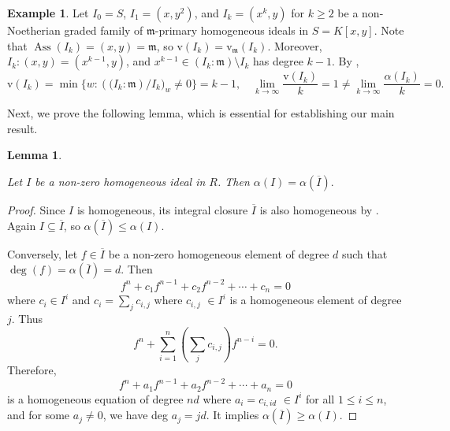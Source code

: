 \documentclass[11pt,reqno,a4paper]{amsart}
\newtheorem{corollary}[theorem]{Corollary}
\newtheorem{lemma}[theorem]{Lemma}
\theoremstyle{definition}
\newtheorem{example}[theorem]{Example}
\begin{document}
\begin{example}
    
    Let \(I_0 = S\), \(I_1 = (x,y^2)\), and \(I_k = (x^k, y)\) for \(k \ge 2\) be a non-Noetherian graded family of \(\mathfrak{m}\)-primary homogeneous ideals in \(S = K[x,y]\). 
    Note that \(\operatorname{Ass}(I_k) = (x,y) = \mathfrak{m}\), so \(\mathrm{v}(I_k) = \mathrm{v}_{\mathfrak{m}}(I_k)\). 
    Moreover, \(I_k : (x,y) = (x^{k-1}, y)\), and \(x^{k-1} \in (I_k : \mathfrak{m}) \setminus I_k\) has degree \(k-1\).
    By \cite[Lemma 1.2]{Conca24}, 
    \[
    \mathrm{v}(I_k) = \min \{ w : \left((I_k : \mathfrak{m}\right) / I_k)_w \neq 0 \} = k-1,
    \quad
    \lim_{k \to \infty} \frac{\mathrm{v}(I_k)}{k} = 1 \neq \lim_{k \to \infty} \frac{\alpha(I_k)}{k} = 0.
    \]
\end{example}

\noindent Next, we prove the following lemma, which is essential for establishing our main result.


\begin{lemma}\label{alpha(I)=alpha(I^bar)}
    

Let $I$ be a non-zero homogeneous ideal in $R$. Then $\alpha(I) = \alpha(\overline{I}).$
\end{lemma}

\begin{proof}
    
Since \(I\) is homogeneous, its integral closure \(\overline{I}\) is also homogeneous by \cite[Corollary 5.2.2]{HunekeSwanson06}. Again $I \subseteq \overline{I}$, so $\alpha(\overline{I}) \leq \alpha(I)$.

Conversely, let $f \in \overline{I}$ be a non-zero homogeneous element of degree $d$ such that $\deg(f) = \alpha(\overline{I}) = d$. Then 
\[
f^n + c_1 f^{n-1} + c_2 f^{n-2} + \cdots + c_n = 0
\]
where $c_i \in I^i$ and $c_i = \sum_j c_{i,j}$ where $c_{i,j}$ $\in I^i$ is a homogeneous element of degree $j$. Thus
\[
f^n + \sum_{i=1}^n \left(\sum_j c_{i,j}\right) f^{n-i} = 0.
\]
Therefore, 
\[
f^n + a_1 f^{n-1} + a_2 f^{n-2} + \cdots + a_n = 0
\]
is a homogeneous equation of degree $nd$ where $a_i = c_{i,id}$  $\in I^i$ for all $1 \leq i \leq n$, and for some $a_j \neq 0$, we have deg $a_j = jd$. It implies $\alpha(\overline{I}) \geq \alpha(I)$.
\end{proof}
\end{document}
